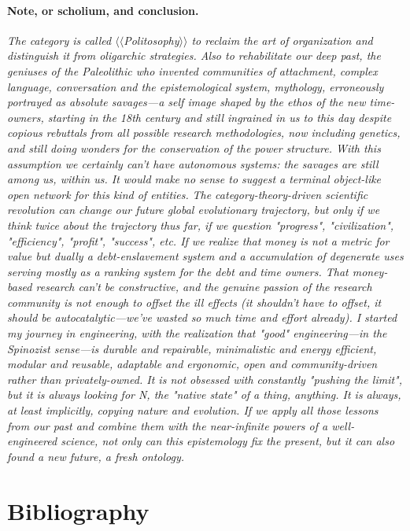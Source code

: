 \documentclass[11pt]{article}
\begin{document}
\paragraph{Note, or scholium, and conclusion.}

\emph{The category is called  \(\langle\!\!\langle\)Politosophy\(\rangle\!\!\rangle\) to
reclaim the art of organization and distinguish it from oligarchic strategies. Also to
rehabilitate our deep past, the geniuses of the Paleolithic who invented communities of
attachment, complex language, conversation and the epistemological system, mythology,
erroneously portrayed as absolute savages---a self image shaped by the ethos of the new
time-owners, starting in the 18th century and still ingrained in us to this day despite
copious rebuttals from all possible research methodologies, now including genetics, and
still doing wonders for the conservation of the power structure. With this assumption we
certainly can't have autonomous systems: the savages are still among us, within us. It
would make no sense to suggest a terminal object-like open network for this kind of
entities.} \emph{The category-theory-driven scientific revolution can change our future
global evolutionary trajectory, but only if we think twice about the trajectory thus
far, if we question "progress", "civilization", "efficiency", "profit", "success", etc.
If we realize that money is not a metric for value but dually a debt-enslavement system
and a accumulation of degenerate uses serving mostly as a ranking system for the debt
and time owners. That money-based research can't be constructive, and the genuine
passion of the research community is not enough to offset the ill effects (it shouldn't
have to offset, it should be autocatalytic---we've wasted so much time and effort
already). I started my journey in engineering, with the realization that "good"
engineering---in the Spinozist sense---is durable and repairable, minimalistic and
energy efficient, modular and reusable, adaptable and ergonomic, open and
community-driven rather than privately-owned. It is not obsessed with constantly
"pushing the limit", but it is always looking for N, the "native state" of a thing,
anything. It is always, at least implicitly, copying nature and evolution. If we apply
all those lessons from our past and combine them with the near-infinite powers of a
well-engineered science, not only can this epistemology fix the present, but it can also
found a new future, a fresh ontology.}

\section*{Bibliography}
\end{document}
